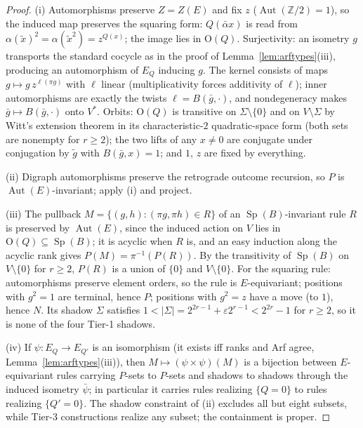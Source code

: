 \documentclass[11pt]{article}
\theoremstyle{plain}
\theoremstyle{definition}
\newcommand{\Sp}{\operatorname{Sp}}
\newcommand{\Orth}{\mathrm{O}}
\newcommand{\Aut}{\operatorname{Aut}}
\begin{document}
\begin{proof}
(i) Automorphisms preserve $Z=Z(E)$ and fix $z$
($\Aut(\mathbb{Z}/2)=1$), so the induced map preserves the
squaring form: $Q(\bar\alpha x)$ is read from
$\alpha(\tilde x)^2=\alpha(\tilde x^2)=z^{Q(x)}$; the image lies in
$\Orth(Q)$. Surjectivity: an isometry $g$ transports the standard cocycle as in
the proof of Lemma~\ref{lem:arftypes}(iii), producing an automorphism of
$E_Q$ inducing $g$. The kernel consists of maps $g\mapsto g\,z^{\ell(\pi g)}$
with $\ell$ linear (multiplicativity forces additivity of $\ell$); inner
automorphisms are exactly the twists $\ell=B(\bar g,\cdot)$, and
nondegeneracy makes $\bar g\mapsto B(\bar g,\cdot)$ onto $V^{*}$. Orbits:
$\Orth(Q)$ is transitive on $\Sigma\setminus\{0\}$ and on $V\setminus\Sigma$ by
Witt's extension theorem in its characteristic-$2$ quadratic-space form
\cite{Taylor} (both sets are nonempty for $r\geq2$); the two lifts of any
$x\neq0$ are conjugate under conjugation by $\tilde g$ with $B(\bar g,x)=1$;
and $1$, $z$ are fixed by everything.

(ii) Digraph automorphisms preserve the retrograde outcome recursion, so
$P$ is $\Aut(E)$-invariant; apply (i) and project.

(iii) The pullback $M=\{(g,h):(\pi g,\pi h)\in R\}$ of an
$\Sp(B)$-invariant rule $R$ is preserved by
$\Aut(E)$, since the induced action on $V$ lies in
$\Orth(Q)\subseteq\Sp(B)$; it is acyclic when $R$ is, and an easy
induction along the acyclic rank gives
$P(M)=\pi^{-1}(P(R))$. By the transitivity of
$\Sp(B)$ on $V\setminus\{0\}$ for $r\geq2$, $P(R)$ is a union
of $\{0\}$ and $V\setminus\{0\}$. For the squaring rule: automorphisms
preserve element orders, so the rule is $E$-equivariant; positions with
$g^2=1$ are terminal, hence $P$; positions with $g^2=z$ have a move (to
$1$), hence $N$. Its shadow $\Sigma$ satisfies
$1<|\Sigma|=2^{2r-1}+\varepsilon2^{r-1}<2^{2r}-1$ for $r\geq2$, so it is
none of the four Tier-1 shadows.

(iv) If $\psi\colon E_Q\to E_{Q'}$ is an isomorphism (it exists iff ranks
and Arf agree, Lemma~\ref{lem:arftypes}(iii)), then
$M\mapsto(\psi\times\psi)(M)$ is a bijection between $E$-equivariant rules
carrying $P$-sets to $P$-sets and shadows to shadows through the induced
isometry $\bar\psi$; in particular it carries rules realizing $\{Q=0\}$ to
rules realizing $\{Q'=0\}$. The shadow constraint of (ii) excludes all but
eight subsets, while Tier-3 constructions realize any subset; the
containment is proper.
\end{proof}
\end{document}
